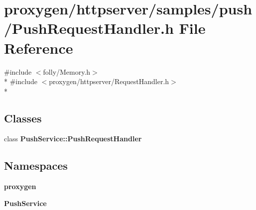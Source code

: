 \section{proxygen/httpserver/samples/push/\+Push\+Request\+Handler.h File Reference}
\label{PushRequestHandler_8h}
{\ttfamily \#include $<$folly/\+Memory.\+h$>$}\\*
{\ttfamily \#include $<$proxygen/httpserver/\+Request\+Handler.\+h$>$}\\*
\subsection*{Classes}
\begin{DoxyCompactItemize}
\item 
class {\bf Push\+Service\+::\+Push\+Request\+Handler}
\end{DoxyCompactItemize}
\subsection*{Namespaces}
\begin{DoxyCompactItemize}
\item 
 {\bf proxygen}
\item 
 {\bf Push\+Service}
\end{DoxyCompactItemize}
